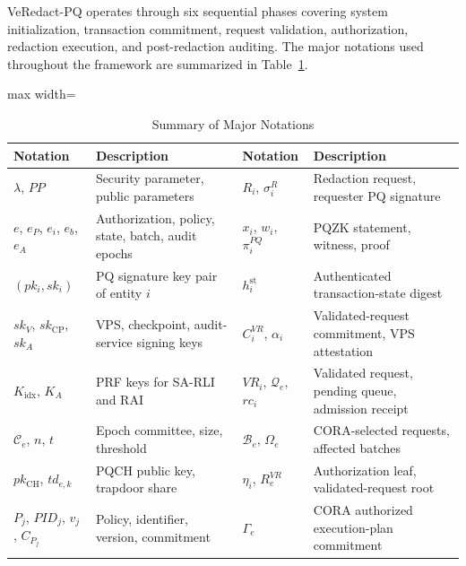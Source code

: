 \documentclass[lettersize,journal]{IEEEtran}
\begin{document}
VeRedact-PQ operates through six sequential phases covering system
initialization, transaction commitment, request validation, authorization,
redaction execution, and post-redaction auditing. The major notations
used throughout the framework are summarized in
Table~\ref{tab:notation}.

\begin{table}[t]
\centering
\caption{Summary of Major Notations}
\label{tab:notation}
\scriptsize
\renewcommand{\arraystretch}{1.10}
\setlength{\tabcolsep}{3.8pt}
\begin{adjustbox}{max width=\textwidth}
\begin{tabular}{@{}ll@{\quad}ll@{}}
\hline
\textbf{Notation} & \textbf{Description} &
\textbf{Notation} & \textbf{Description}\\
\hline

$\lambda$, $PP$
& Security parameter, public parameters &
$R_i$, $\sigma_i^R$
& Redaction request, requester PQ signature\\

$e$, $e_P$, $e_i$, $e_b$, $e_A$
& Authorization, policy, state, batch, audit epochs &
$x_i$, $w_i$, $\pi_i^{PQ}$
& PQZK statement, witness, proof\\

$(pk_i,sk_i)$
& PQ signature key pair of entity $i$ &
$h_i^{\mathrm{st}}$
& Authenticated transaction-state digest\\

$sk_V$, $sk_{\mathrm{CP}}$, $sk_A$
& VPS, checkpoint, audit-service signing keys &
$C_i^{VR}$, $\alpha_i$
& Validated-request commitment, VPS attestation\\

$K_{\mathrm{idx}}$, $K_A$
& PRF keys for SA-RLI and RAI &
$VR_i$, $\mathcal{Q}_e$, $rc_i$
& Validated request, pending queue, admission receipt\\

$\mathcal{C}_e$, $n$, $t$
& Epoch committee, size, threshold &
$\mathcal{B}_e$, $\Omega_e$
& CORA-selected requests, affected batches\\

$pk_{\mathrm{CH}}$, $td_{e,k}$
& PQCH public key, trapdoor share &
$\eta_i$, $R_e^{VR}$
& Authorization leaf, validated-request root\\

$P_j$, $PID_j$, $v_j$, $C_{P_j}$
& Policy, identifier, version, commitment &
$\Gamma_e$
& CORA authorized execution-plan commitment\\


\end{tabular}
\end{adjustbox}
\end{table}
\end{document}
